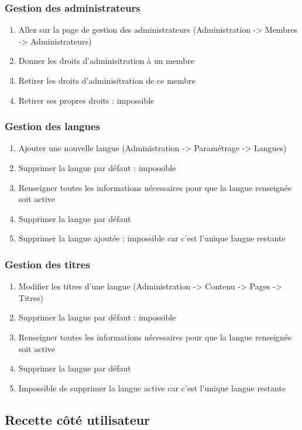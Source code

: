 \documentclass[11pt]{report}
\begin{document}
\subsubsection*{Gestion des administrateurs}
\begin{enumerate}
 \item Allez sur la page de gestion des administrateurs (Administration -> Membres -> Administrateurs)
 \item Donner les droits d'adminisitration à un membre
 \item Retirer les droits d'adminisitration de ce membre
 \item Retirer ses propres droits : impossible
\end{enumerate}

\subsubsection*{Gestion des langues}
\begin{enumerate}
 \item Ajouter une nouvelle langue (Administration -> Paramétrage -> Langues)
 \item Supprimer la langue par défaut : impossible
 \item Renseigner toutes les informations nécessaires pour que la langue renseignée soit active
 \item Supprimer la langue par défaut
 \item Supprimer la langue ajoutée : impossible car c'est l'unique langue restante
\end{enumerate}

\subsubsection*{Gestion des titres}
\begin{enumerate}
 \item Modifier les titres d'une langue (Administration -> Contenu -> Pages -> Titres)
 \item Supprimer la langue par défaut : impossible
 \item Renseigner toutes les informations nécessaires pour que la langue renseignée soit active
 \item Supprimer la langue par défaut
 \item Impossible de supprimer la langue active car c'est l'unique langue restante
\end{enumerate}

\subsection{Recette côté utilisateur}
\end{document}
